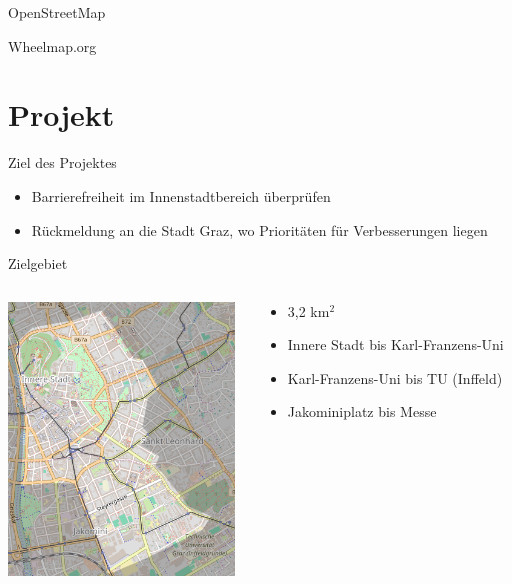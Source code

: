 \documentclass{beamer}
\begin{document}
\begin{frame}{OpenStreetMap}

  Wheelmap.org


\end{frame}

\section{Projekt}

\begin{frame}{Ziel des Projektes}

    \begin{itemize}
       \item Barrierefreiheit im Innenstadtbereich überprüfen

         \pause

      \item Rückmeldung an die Stadt Graz, wo Prioritäten für Verbesserungen liegen
    \end{itemize}


\end{frame}

\begin{frame}{Zielgebiet}

  \begin{columns}[c]
    \begin{column}[T]{.6\textwidth}
      \begin{center}
      \vspace{-1cm}
      \includegraphics[width=6cm]{gebiet.png}
      \end{center}
    \end{column}
    \begin{column}[T]{.4\textwidth}
      \begin{itemize}
            \item 3,2 km$^2$
            \item Innere Stadt bis Karl-Franzens-Uni
    \item       Karl-Franzens-Uni bis TU (Inffeld)
  \item       Jakominiplatz bis Messe
    \end{itemize}
    \end{column}
  \end{columns}

\end{frame}
\end{document}
